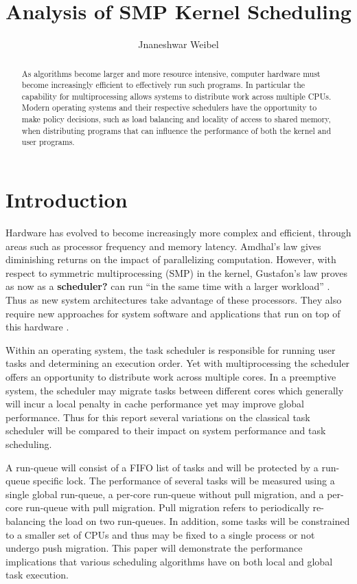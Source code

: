 \documentclass[11pt]{article}
\title{Analysis of SMP Kernel Scheduling}
\author{Jnaneshwar Weibel}
\begin{document}
\maketitle

\begin{abstract}
	As algorithms become larger and more resource intensive, computer hardware must become increasingly efficient to effectively run such programs.  In particular the capability for multiprocessing allows systems to distribute work across multiple CPUs.  Modern operating systems and their respective schedulers have the opportunity to make policy decisions, such as load balancing and locality of access to shared memory, when distributing programs that can influence the performance of both the kernel and user programs.
\end{abstract}



\section{Introduction}
\label{sec:introduction}
Hardware has evolved to become increasingly more complex and efficient, through areas such as processor frequency and memory latency.  Amdhal's law gives diminishing returns on the impact of parallelizing computation.  However, with respect to symmetric multiprocessing (SMP) in the kernel, Gustafon's law proves as now as a \textbf{scheduler?} can run ``in the same time with a larger workload'' \cite{gustafon}.  Thus as new system architectures take advantage of these processors.  They also require new approaches for system software and applications that run on top of this hardware \cite{nitrd}.

Within an operating system, the task scheduler is responsible for running user tasks and determining an execution order.  Yet with multiprocessing the scheduler offers an opportunity to distribute work across multiple cores.  In a preemptive system, the scheduler may migrate tasks between different cores which generally will incur a local penalty in cache performance yet may improve global performance.  Thus for this report several variations on the classical task scheduler will be compared to their impact on system performance and task scheduling.

A run-queue will consist of a FIFO list of tasks and will be protected by a run-queue specific lock.  The performance of several tasks will be measured using a single global run-queue, a per-core run-queue without pull migration, and a per-core run-queue with pull migration.  Pull migration refers to periodically re-balancing the load on two run-queues.  In addition, some tasks will be constrained to a smaller set of CPUs and thus may be fixed to a single process or not undergo push migration.  This paper will demonstrate the performance implications that various scheduling algorithms have on both local and global task execution.
\end{document}
